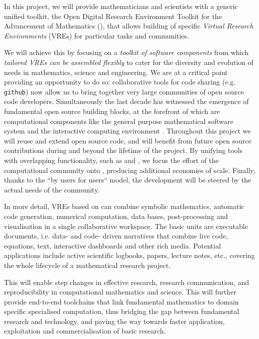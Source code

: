 In this project, we will provide mathematicians and scientists with a
generic unified toolkit, the Open Digital Research Environment Toolkit
for the Advancement of Mathematics (\TheProject), that allows
building of specific \emph{Virtual Research Environments} (VREs) for
particular tasks and communities.


We will achieve this by focusing on a \emph{toolkit of software
  components} from which \emph{tailored VREs can be assembled
  flexibly} to cater for the diversity and evolution of needs in
mathematics, science and engineering.  We are at a critical point providing
an opportunity to do so: collaborative tools for code sharing (e.g.
\texttt{github}) now allow us to bring together very large communities
of open source code developers. %
Simultaneously the last decade has witnessed the emergence of fundamental
open source building blocks, at the forefront of which are computational
components like the general purpose mathematical software system \Sage
and the interactive computing environment \Jupyter.
Throughout this project we will reuse and extend open source code, and
\TheProject will benefit from future open source contributions during
and beyond the lifetime of the project. By unifying tools with
overlapping functionality, such as \Jupyter and \Sage, we focus the
effort of the computational community onto \TheProject, producing
additional economies of scale. Finally, thanks to the ``by users for
users`` model, the development will be steered by the actual needs of
the community.

In more detail, VREs based on \TheProject can combine symbolic
mathematics, automatic code generation, numerical computation, data
bases, post-processing and visualisation in a single collaborative
workspace. The basic units are executable documents, i.e. data- and
code- driven narratives that combine live code, equations, text,
interactive dashboards and other rich media. Potential applications
include active scientific logbooks, papers, lecture notes, etc.,
covering the whole lifecycle of a mathematical research project.

This will enable step changes in effective research, research
communication, and reproducibility in computational mathematics and
science. This will further provide end-to-end toolchains that link
fundamental mathematics to domain specific specialised computation,
thus bridging the gap between fundamental research and technology, and
paving the way towards faster application, exploitation and
commercialisation of basic research.

